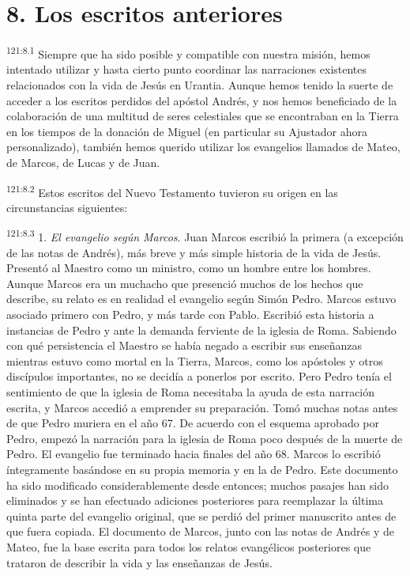 \section*{8. Los escritos anteriores}
\par 
\textsuperscript{121:8.1} Siempre que ha sido posible y compatible con nuestra misión, hemos intentado utilizar y hasta cierto punto coordinar las narraciones existentes relacionados con la vida de Jesús en Urantia. Aunque hemos tenido la suerte de acceder a los escritos perdidos del apóstol Andrés, y nos hemos beneficiado de la colaboración de una multitud de seres celestiales que se encontraban en la Tierra en los tiempos de la donación de Miguel (en particular su Ajustador ahora personalizado), también hemos querido utilizar los evangelios llamados de Mateo, de Marcos, de Lucas y de Juan.

\par 
\textsuperscript{121:8.2} Estos escritos del Nuevo Testamento tuvieron su origen en las circunstancias siguientes:

\par 
\textsuperscript{121:8.3} 1. \textit{El evangelio según Marcos}. Juan Marcos escribió la primera (a excepción de las notas de Andrés), más breve y más simple historia de la vida de Jesús. Presentó al Maestro como un ministro, como un hombre entre los hombres. Aunque Marcos era un muchacho que presenció muchos de los hechos que describe, su relato es en realidad el evangelio según Simón Pedro. Marcos estuvo asociado primero con Pedro, y más tarde con Pablo. Escribió esta historia a instancias de Pedro y ante la demanda ferviente de la iglesia de Roma. Sabiendo con qué persistencia el Maestro se había negado a escribir sus enseñanzas mientras estuvo como mortal en la Tierra, Marcos, como los apóstoles y otros discípulos importantes, no se decidía a ponerlos por escrito. Pero Pedro tenía el sentimiento de que la iglesia de Roma necesitaba la ayuda de esta narración escrita, y Marcos accedió a emprender su preparación. Tomó muchas notas antes de que Pedro muriera en el año 67. De acuerdo con el esquema aprobado por Pedro, empezó la narración para la iglesia de Roma poco después de la muerte de Pedro. El evangelio fue terminado hacia finales del año 68. Marcos lo escribió íntegramente basándose en su propia memoria y en la de Pedro. Este documento ha sido modificado considerablemente desde entonces; muchos pasajes han sido eliminados y se han efectuado adiciones posteriores para reemplazar la última quinta parte del evangelio original, que se perdió del primer manuscrito antes de que fuera copiada. El documento de Marcos, junto con las notas de Andrés y de Mateo, fue la base escrita para todos los relatos evangélicos posteriores que trataron de describir la vida y las enseñanzas de Jesús.

